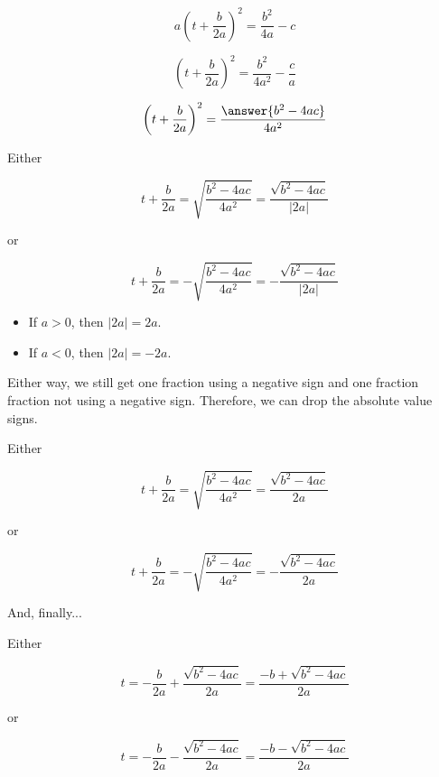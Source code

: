 \documentclass{ximera}
\begin{document}
\begin{explanation}
\[ a \left(t + \frac{b}{2 a} \right)^2  = \frac{b^2}{4 a} - c\]

\[ \left(t + \frac{b}{2 a} \right)^2  = \frac{b^2}{4 a^2} - \frac{c}{a}\]

\[ \left(t + \frac{b}{2 a} \right)^2  = \frac{\answer{b^2 - 4 a c}}{4 a^2} \]
\end{explanation}


Either 


\[ t + \frac{b}{2 a}  = \sqrt{\frac{b^2 - 4 a c}{4 a^2}}  = \frac{\sqrt{b^2 - 4 a c}}{| 2a |}   \]

or


\[ t + \frac{b}{2 a}  = -\sqrt{\frac{b^2 - 4 a c}{4 a^2}} = -\frac{\sqrt{b^2 - 4 a c}}{| 2a |}    \]



\begin{itemize}
\item If $a > 0$, then $| 2a | = 2a$.
\item If $a < 0$, then $| 2a | = -2a$.
\end{itemize}

Either way, we still get one fraction using a negative sign and one fraction fraction not using a negative sign.  Therefore, we can drop the absolute value signs.  





Either 


\[ t + \frac{b}{2 a}  = \sqrt{\frac{b^2 - 4 a c}{4 a^2}}  = \frac{\sqrt{b^2 - 4 a c}}{2a}   \]

or


\[ t + \frac{b}{2 a}  = -\sqrt{\frac{b^2 - 4 a c}{4 a^2}} = -\frac{\sqrt{b^2 - 4 a c}}{2a}    \]










And, finally...


\begin{conclusion}



Either 


\[ t   = - \frac{b}{2 a} + \frac{\sqrt{b^2 - 4 a c}}{2a}  = \frac{-b + \sqrt{b^2 - 4 a c}}{2a}      \]

or


\[ t  = - \frac{b}{2 a}  -\frac{\sqrt{b^2 - 4 a c}}{2a} =    \frac{-b - \sqrt{b^2 - 4 a c}}{2a}      \]

\end{conclusion}
\end{document}
